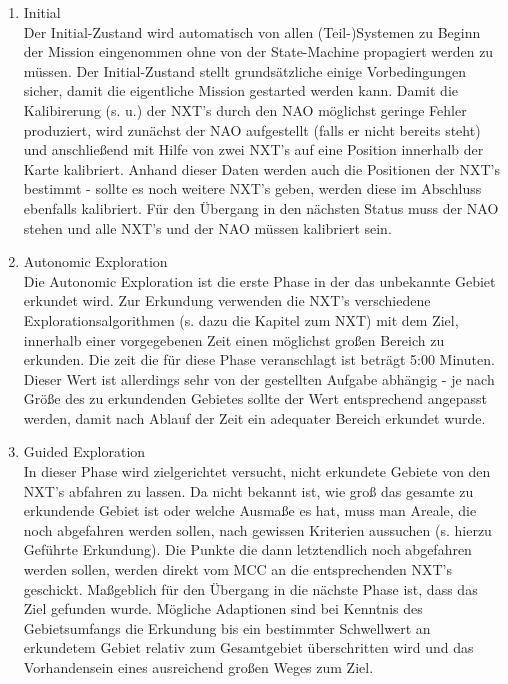 \begin{enumerate}
\item Initial\\
Der Initial-Zustand wird automatisch von allen (Teil-)Systemen zu Beginn der Mission eingenommen ohne von der State-Machine propagiert werden zu müssen. Der Initial-Zustand stellt grundsätzliche einige Vorbedingungen sicher, damit die eigentliche Mission gestarted werden kann. Damit die Kalibirerung (s. u.) der NXT's durch den NAO möglichst geringe Fehler produziert, wird zunächst der NAO aufgestellt (falls er nicht bereits steht) und anschließend mit Hilfe von zwei NXT's auf eine Position innerhalb der Karte kalibriert. Anhand dieser Daten werden auch die Positionen der NXT's bestimmt - sollte es noch weitere NXT's geben, werden diese im Abschluss ebenfalls kalibriert. Für den Übergang in den nächsten Status muss der NAO stehen und alle NXT's und der NAO müssen kalibriert sein.

\item Autonomic Exploration\\
Die Autonomic Exploration ist die erste Phase in der das unbekannte Gebiet erkundet wird. Zur Erkundung verwenden die NXT's verschiedene Explorationsalgorithmen (s. dazu die Kapitel zum NXT) mit dem Ziel, innerhalb einer vorgegebenen Zeit einen möglichst großen Bereich zu erkunden. Die zeit die für diese Phase veranschlagt ist beträgt 5:00 Minuten. Dieser Wert ist allerdings sehr von der gestellten Aufgabe abhängig - je nach Größe des zu erkundenden Gebietes sollte der Wert entsprechend angepasst werden, damit nach Ablauf der Zeit ein adequater Bereich erkundet wurde.

\item Guided Exploration\\
In dieser Phase wird zielgerichtet versucht, nicht erkundete Gebiete von den NXT's abfahren zu lassen. Da nicht bekannt ist, wie groß das gesamte zu erkundende Gebiet ist oder welche Ausmaße es hat, muss man Areale, die noch abgefahren werden sollen, nach gewissen Kriterien aussuchen (s. hierzu Geführte Erkundung). Die Punkte die dann letztendlich noch abgefahren werden sollen, werden direkt vom MCC an die entsprechenden NXT's geschickt. Maßgeblich für den Übergang in die nächste Phase ist, dass das Ziel gefunden wurde. Mögliche Adaptionen sind bei Kenntnis des Gebietsumfangs die Erkundung bis ein bestimmter Schwellwert an erkundetem Gebiet relativ zum Gesamtgebiet überschritten wird und das Vorhandensein eines ausreichend großen Weges zum Ziel.


\end{enumerate}
